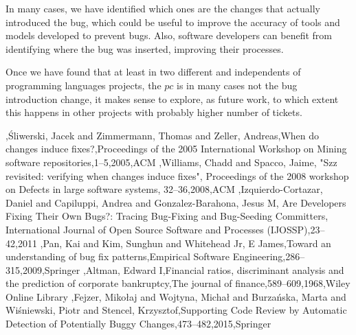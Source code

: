 \documentclass[conference]{IEEEtran}
\begin{document}
In many cases, we have identified which ones are the changes that actually introduced the bug, which could be useful to improve the accuracy of tools and models developed to prevent bugs. Also, software developers can benefit from identifying where the bug was inserted, improving their processes.

Once we have found that at least in two different and independents of programming languages projects, the $pc$ is in many cases not the bug introduction change, it makes sense to explore, as future work, to which extent this happens in other projects with probably higher number of tickets.


\begin{thebibliography}{1}

,{\'S}liwerski, Jacek and Zimmermann, Thomas and Zeller, Andreas,When do changes induce fixes?,Proceedings of the 2005 International Workshop on Mining software repositories,1--5,2005,ACM
,Williams, Chadd and Spacco, Jaime, "Szz revisited: verifying when changes induce fixes", Proceedings of the 2008 workshop on Defects in large software systems, 32--36,2008,ACM
,Izquierdo-Cortazar, Daniel and Capiluppi, Andrea and Gonzalez-Barahona, Jesus M, Are Developers Fixing Their Own Bugs?: Tracing Bug-Fixing and Bug-Seeding Committers,
  International Journal of Open Source Software and Processes (IJOSSP),23--42,2011
,Pan, Kai and Kim, Sunghun and Whitehead Jr, E James,Toward an understanding of bug fix patterns,Empirical Software Engineering,286--315,2009,Springer
,Altman, Edward I,Financial ratios, discriminant analysis and the prediction of corporate bankruptcy,The journal of finance,589--609,1968,Wiley Online Library
,Fejzer, Miko{\l}aj and Wojtyna, Micha{\l} and Burza{\'n}ska, Marta and Wi{\'s}niewski, Piotr and Stencel, Krzysztof,Supporting Code Review by Automatic Detection of Potentially Buggy Changes,473--482,2015,Springer
\end{thebibliography}




\end{document}
